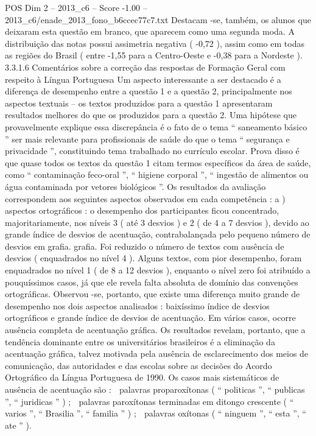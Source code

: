 \begin{textsample}{POS Dim 2 – 2013\_c6 – Score -1.00 – 2013\_c6/enade\_2013\_fono\_b6ccec77c7.txt}
Destacam -se, também, os alunos que deixaram esta questão em branco, que aparecem como uma segunda moda.
A distribuição das notas possui assimetria negativa ( -0,72 ), assim como em todas as regiões do Brasil ( entre -1,55 para a Centro-Oeste e -0,38 para a Nordeste ). 3.3.1.6 Comentários sobre a correção das respostas de Formação Geral com respeito à Língua Portuguesa Um aspecto interessante a ser destacado é a diferença de desempenho entre a questão 1 e a questão 2, principalmente nos aspectos textuais – os textos produzidos para a questão 1 apresentaram resultados melhores do que os produzidos para a questão 2.
Uma hipótese que provavelmente explique essa discrepância é o fato de o tema “ saneamento básico ” ser mais relevante para profissionais de saúde do que o tema “ segurança e privacidade ”, constituindo tema trabalhado no currículo escolar.
Prova disso é que quase todos os textos da questão 1 citam termos específicos da área de saúde, como “ contaminação feco-oral ”, “ higiene corporal ”, “ ingestão de alimentos ou água contaminada por vetores biológicos ”.
Os resultados da avaliação correspondem aos seguintes aspectos observados em cada competência : a ) aspectos ortográficos : o desempenho dos participantes ficou concentrado, majoritariamente, nos níveis 3 ( até 3 desvios ) e 2 ( de 4 a 7 desvios ), devido ao grande índice de desvios de acentuação, contrabalançada pelo pequeno número de desvios em grafia. grafia.
Foi reduzido o número de textos com ausência de desvios ( enquadrados no nível 4 ).
Alguns textos, com pior desempenho, foram enquadrados no nível 1 ( de 8 a 12 desvios ), enquanto o nível zero foi atribuído a pouquíssimos casos, já que ele revela falta absoluta de domínio das convenções ortográficas.
Observou -se, portanto, que existe uma diferença muito grande de desempenho nos dois aspectos analisados : baixíssimo índice de desvios ortográficos e grande índice de desvios de acentuação.
Em vários casos, ocorre ausência completa de acentuação gráfica.
Os resultados revelam, portanto, que a tendência dominante entre os universitários brasileiros é a eliminação da acentuação gráfica, talvez motivada pela ausência de esclarecimento dos meios de comunicação, das autoridades e das escolas sobre as decisões do Acordo Ortográfico da Língua Portuguesa de 1990.
Os casos mais sistemáticos de ausência de acentuação são :  palavras proparoxítonas ( “ politicas ”, “ publicas ”, “ juridicas ” ) ;  palavras paroxítonas terminadas em ditongo crescente ( “ varios ”, “ Brasilia ”, “ familia ” ) ;  palavras oxítonas ( “ ninguem ”, “ esta ”, “ ate ” ).

\end{textsample}
